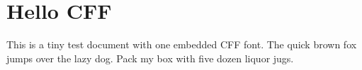 \documentclass[11pt]{article}
\begin{document}
\section*{Hello CFF}
This is a tiny test document with one embedded CFF font.
The quick brown fox jumps over the lazy dog.
Pack my box with five dozen liquor jugs.
\end{document}

